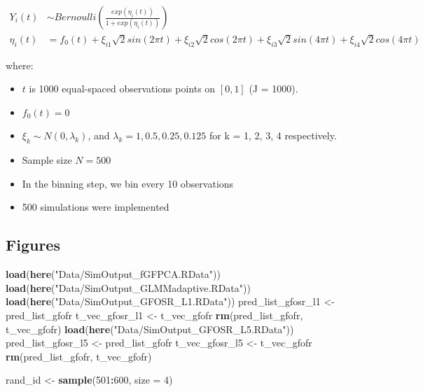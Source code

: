\documentclass[
]{article}
\newenvironment{Shaded}{\begin{snugshade}}{\end{snugshade}}
\newcommand{\AttributeTok}[1]{\textcolor[rgb]{0.13,0.29,0.53}{#1}}
\newcommand{\DecValTok}[1]{\textcolor[rgb]{0.00,0.00,0.81}{#1}}
\newcommand{\FunctionTok}[1]{\textcolor[rgb]{0.13,0.29,0.53}{\textbf{#1}}}
\newcommand{\NormalTok}[1]{#1}
\newcommand{\OtherTok}[1]{\textcolor[rgb]{0.56,0.35,0.01}{#1}}
\newcommand{\SpecialCharTok}[1]{\textcolor[rgb]{0.81,0.36,0.00}{\textbf{#1}}}
\newcommand{\StringTok}[1]{\textcolor[rgb]{0.31,0.60,0.02}{#1}}
\providecommand{\tightlist}{%
  \setlength{\itemsep}{0pt}\setlength{\parskip}{0pt}}
\begin{document}
\[\begin{aligned}
Y_i(t) & \sim Bernoulli(\frac{exp(\eta_i(t))}{1+exp(\eta_i(t))}) \\
\eta_i(t) &= f_0(t)+ \xi_{i1}\sqrt{2}sin(2\pi t)+\xi_{i2}\sqrt{2}cos(2\pi t)+\xi_{i3}\sqrt{2}sin(4\pi t)+\xi_{i4}\sqrt{2}cos(4\pi t)
\end{aligned}\]

where:

\begin{itemize}
\tightlist
\item
  \(t\) is 1000 equal-spaced observations points on \([0, 1]\) (J =
  1000).
\item
  \(f_0(t)=0\)
\item
  \(\xi_k \sim N(0, \lambda_k)\), and
  \(\lambda_k = 1, 0.5, 0.25, 0.125\) for k = 1, 2, 3, 4 respectively.
\item
  Sample size \(N = 500\)
\item
  In the binning step, we bin every 10 observations
\item
  500 simulations were implemented
\end{itemize}

\hypertarget{figures}{%
\subsection{Figures}\label{figures}}

\begin{Shaded}
\begin{Highlighting}[]
\FunctionTok{load}\NormalTok{(}\FunctionTok{here}\NormalTok{(}\StringTok{"Data/SimOutput\_fGFPCA.RData"}\NormalTok{))}
\FunctionTok{load}\NormalTok{(}\FunctionTok{here}\NormalTok{(}\StringTok{"Data/SimOutput\_GLMMadaptive.RData"}\NormalTok{))}
\FunctionTok{load}\NormalTok{(}\FunctionTok{here}\NormalTok{(}\StringTok{"Data/SimOutput\_GFOSR\_L1.RData"}\NormalTok{))}
\NormalTok{pred\_list\_gfosr\_l1 }\OtherTok{\textless{}{-}}\NormalTok{ pred\_list\_gfofr}
\NormalTok{t\_vec\_gfosr\_l1 }\OtherTok{\textless{}{-}}\NormalTok{ t\_vec\_gfofr}
\FunctionTok{rm}\NormalTok{(pred\_list\_gfofr, t\_vec\_gfofr)}
\FunctionTok{load}\NormalTok{(}\FunctionTok{here}\NormalTok{(}\StringTok{"Data/SimOutput\_GFOSR\_L5.RData"}\NormalTok{))}
\NormalTok{pred\_list\_gfosr\_l5 }\OtherTok{\textless{}{-}}\NormalTok{ pred\_list\_gfofr}
\NormalTok{t\_vec\_gfosr\_l5 }\OtherTok{\textless{}{-}}\NormalTok{ t\_vec\_gfofr}
\FunctionTok{rm}\NormalTok{(pred\_list\_gfofr, t\_vec\_gfofr)}

\NormalTok{rand\_id }\OtherTok{\textless{}{-}} \FunctionTok{sample}\NormalTok{(}\DecValTok{501}\SpecialCharTok{:}\DecValTok{600}\NormalTok{, }\AttributeTok{size =} \DecValTok{4}\NormalTok{)}
\end{Highlighting}
\end{Shaded}
\end{document}
